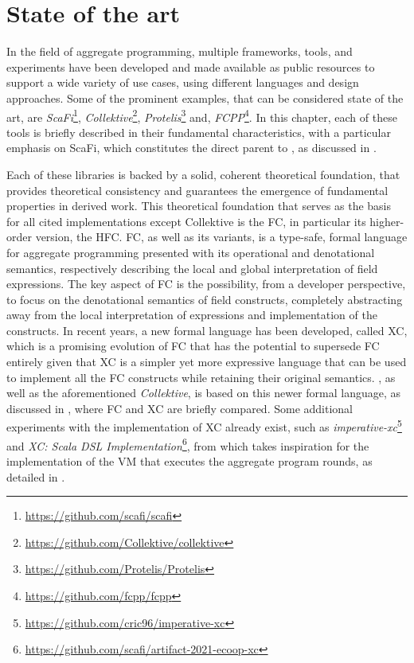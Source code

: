 \chapter{State of the art}
\label{chap:state-of-the-art}

In the field of aggregate programming\cite{aggregate-programming}, multiple frameworks, tools, and experiments have been developed and made available as public resources to support a wide variety of use cases, using different languages and design approaches.
%
Some of the prominent examples, that can be considered state of the art, are \textit{ScaFi}\footnote{\url{https://github.com/scafi/scafi}}\cite{scafi}, \textit{Collektive}\footnote{\url{https://github.com/Collektive/collektive}}, \textit{Protelis}\footnote{\url{https://github.com/Protelis/Protelis}}\cite{protelis} and, \textit{FCPP}\footnote{\url{https://github.com/fcpp/fcpp}}\cite{fcpp}.
%
In this chapter, each of these tools is briefly described in their fundamental characteristics, with a particular emphasis on ScaFi, which constitutes the direct parent to \this, as discussed in .

Each of these libraries is backed by a solid, coherent theoretical foundation, that provides theoretical consistency and guarantees the emergence of fundamental properties in derived work.
%
This theoretical foundation that serves as the basis for all cited implementations except Collektive is the \ac{FC}\cite{fc}, in particular its higher-order version, the \ac{HFC}\cite{hofc}.
%
\ac{FC}, as well as its variants, is a type-safe, formal language for aggregate programming\cite{fc, from-dc-to-fc-and-ap} presented with its operational and denotational semantics, respectively describing the local and global interpretation of field expressions\cite{from-dc-to-fc-and-ap}.
%
The key aspect of \ac{FC} is the possibility, from a developer perspective, to focus on the denotational semantics of field constructs, completely abstracting away from the local interpretation of expressions and implementation of the constructs.
%
In recent years, a new formal language has been developed, called \ac{XC}\cite{xc}, which is a promising evolution of \ac{FC} that has the potential to supersede \ac{FC} entirely given that \ac{XC} is a simpler yet more expressive language that can be used to implement all the \ac{FC} constructs while retaining their original semantics.
%
\this, as well as the aforementioned \textit{Collektive}, is based on this newer formal language, as discussed in , where \ac{FC} and \ac{XC} are briefly compared.
%
Some additional experiments with the implementation of \ac{XC} already exist, such as \textit{imperative-xc}\footnote{\url{https://github.com/cric96/imperative-xc}} and \textit{XC: Scala DSL Implementation}\footnote{\url{https://github.com/scafi/artifact-2021-ecoop-xc}}\cite{xc-experiment-with-scafi}, from which \this takes inspiration for the implementation of the \ac{VM} that executes the aggregate program rounds, as detailed in .


